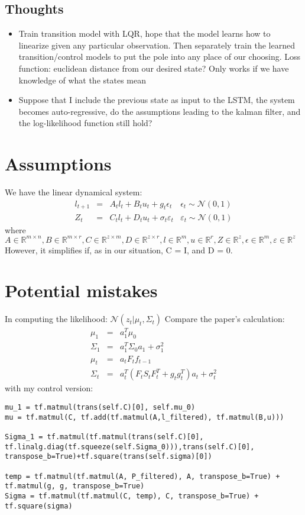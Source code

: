 \documentclass[twoside]{article}
\begin{document}
\subsection{Thoughts}
\begin{itemize}
\item Train transition model with LQR, hope that the model learns how to linearize given any particular observation. Then separately train the learned transition/control models to put the pole into any place of our choosing. 
Loss function: euclidean distance from our desired state? Only works if we have knowledge of what the states mean
\item Suppose that I include the previous state as input to the LSTM, the system becomes auto-regressive, do the assumptions leading to the kalman filter, and the log-likelihood function still hold?
\end{itemize}

\section{Assumptions}
We have the linear dynamical system:\[\begin{array}{lclr}l_{t+1} & = & A_{t}l_{t}+B_{t}u_{t}+g_{t}\epsilon_{t}&\epsilon_{t}\sim\mathcal{N}(0,1) \\ Z_{t} & = & C_{t}l_{t} + D_{t}u_{t} + \sigma_{t}\varepsilon_{t} & \varepsilon_{t}\sim\mathcal{N}(0,1)\end{array}\]
where $A\in\mathbb{R}^{m\times n}, B\in\mathbb{R}^{m\times r}, C\in\mathbb{R}^{z\times m}, D\in\mathbb{R}^{z\times r}, l\in\mathbb{R}^{m}, u\in\mathbb{R}^{r}, Z\in\mathbb{R}^{z}, \epsilon\in\mathbb{R}^{m}, \varepsilon\in\mathbb{R}^{z}$
However, it simplifies if, as in our situation, C = I, and D = 0.

\section{Potential mistakes}
In computing the likelihood: $\mathcal{N}(z_{t}|\mu_{t},\Sigma_{t})$
Compare the paper's calculation:\[\begin{array}{lcl} \mu_{1} & = & a_{1}^{T}\mu_{0} \\ \Sigma_{1} & = & a_{1}^{T}\Sigma_{0}a_{1} + \sigma_{1}^{2} \\ \mu_{t} & = & a_{t}F_{t}f_{t-1} \\ \Sigma_{t} & = & a_{t}^{T}(F_{t}S_{t}F_{t}^{T}+g_{t}g_{t}^{T})a_{t}+\sigma_{t}^{2}\end{array}\]
with my control version:
\begin{lstlisting}
mu_1 = tf.matmul(trans(self.C)[0], self.mu_0)
mu = tf.matmul(C, tf.add(tf.matmul(A,l_filtered), tf.matmul(B,u)))

Sigma_1 = tf.matmul(tf.matmul(trans(self.C)[0], tf.linalg.diag(tf.squeeze(self.Sigma_0))),trans(self.C)[0], transpose_b=True)+tf.square(trans(self.sigma)[0])

temp = tf.matmul(tf.matmul(A, P_filtered), A, transpose_b=True) + tf.matmul(g, g, transpose_b=True)
Sigma = tf.matmul(tf.matmul(C, temp), C, transpose_b=True) + tf.square(sigma)
\end{lstlisting}
\end{document}
